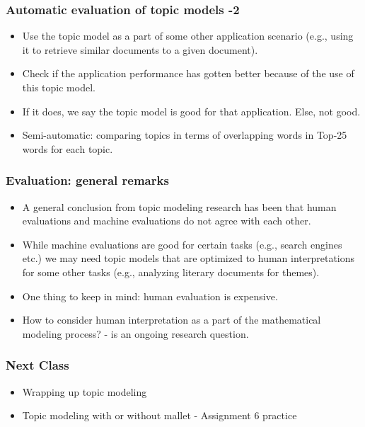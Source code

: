 \documentclass{beamer}
\begin{document}
\begin{frame}
\frametitle{Automatic evaluation of topic models -2}
\begin{itemize}
\item Use the topic model as a part of some other application scenario (e.g., using it to retrieve similar documents to a given document).
\item Check if the application performance has gotten better because of the use of this topic model.
\item If it does, we say the topic model is good for that application. Else, not good. \pause
\item Semi-automatic: comparing topics in terms of overlapping words in Top-25 words for each topic.
\end{itemize}
\end{frame}

\begin{frame}
\frametitle{Evaluation: general remarks}
\begin{itemize}
\item A general conclusion from topic modeling research has been that human evaluations and machine evaluations do not agree with each other. \item While machine evaluations are good for certain tasks (e.g., search engines etc.) we may need topic models that are optimized to human interpretations for some other tasks (e.g., analyzing literary documents for themes). \pause
\item One thing to keep in mind: human evaluation is expensive.
\item How to consider human interpretation as a part of the mathematical modeling process? - is an ongoing research question.
\end{itemize}
\end{frame}

\begin{frame}
\frametitle{Next Class}
\begin{itemize}
\item Wrapping up topic modeling
\item Topic modeling with or without mallet - Assignment 6 practice
\end{itemize}
\end{frame}
\end{document}
